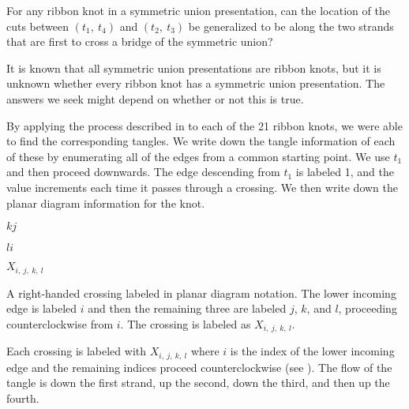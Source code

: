 \begin{paper}
{For any ribbon knot in a symmetric union presentation, can the location of
the cuts between $(t_1,~t_4)$ and $(t_2,~t_3)$ be generalized to be along the
two strands that are first to cross a bridge of the symmetric union?}

It is known that all symmetric union presentations are ribbon knots, but it is
unknown whether every ribbon knot has a symmetric union presentation.
The answers we seek might depend on whether or not this is true.


By applying the process described in \thmRibbon to each of the 21 ribbon knots,
we were able to find the corresponding tangles.
We write down the tangle information of each of these by enumerating all of the
edges from a common starting point.
We use $t_1$ and then proceed downwards.
The edge descending from $t_1$ is labeled 1, and the value increments each time
it passes through a crossing.
We then write down the planar diagram information for the knot.\\

{\hspace{0.3in}\hspace{0.275\columnwidth}$k$\hspace{0.2\columnwidth}$j$
\vspace{-0.5em}\begin{center}\end{center}
\vspace{-0.5em}
\hspace{0.3in}\hspace{0.275\columnwidth}$l$\hspace{0.2\columnwidth}$i$

\hspace{0.3in}\hspace{0.31\columnwidth}$X_{i,~j,~k,~l}$}
{A right-handed crossing labeled in planar diagram notation.
The lower incoming edge is labeled $i$ and then the remaining three are
labeled $j$, $k$, and $l$, proceeding counterclockwise from $i$.
The crossing is labeled as $X_{i,~j,~k,~l}$.}

Each crossing is labeled with $X_{i,~j,~k,~l}$ where $i$ is the index of the
lower incoming edge and the remaining indices proceed counterclockwise (see
\figCrossing).
The flow of the tangle is down the first strand, up the second, down the third,
and then up the fourth.\\


\end{paper}
